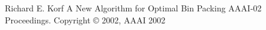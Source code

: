 \documentclass[11pt]{article}
\theoremstyle{definition}
\begin{document}
\begin{thebibliography}{9}
	Richard E. Korf
	A New Algorithm for Optimal Bin Packing
	AAAI-02 Proceedings. Copyright © 2002, AAAI
	2002

\end{thebibliography}
\end{document}
